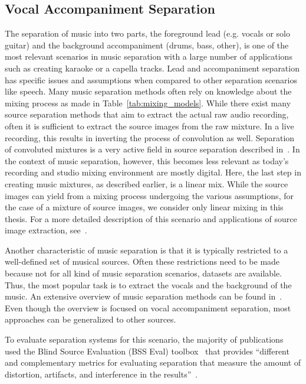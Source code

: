 \subsection{Vocal Accompaniment Separation}
The separation of music into two parts, the foreground lead (e.g. vocals or solo guitar) and the background accompaniment (drums, bass, other), is one of the most relevant scenarios in music separation with a large number of applications such as creating karaoke or a capella tracks.
Lead and accompaniment separation has specific issues and assumptions when compared to other separation scenarios like speech.
Many music separation methods often rely on knowledge about the mixing process as made in Table~\ref{tab:mixing_models}.
While there exist many source separation methods that aim to extract the actual raw audio recording, often it is sufficient to extract the source images from the raw mixture.
In a live recording, this results in inverting the process of convolution as well.
Separation of convoluted mixtures is a very active field in source separation described in~\cite{pedersen07}.
In the context of music separation, however, this becomes less relevant as today's recording and studio mixing environment are mostly digital.
Here, the last step in creating music mixtures, as described earlier, is a linear mix.
While the source images can yield from a mixing process undergoing the various assumptions, for the case of a mixture of source images, we consider only linear mixing in this thesis.
For a more detailed description of this scenario and applications of source image extraction, see~\cite{sturmel12}.
\par
Another characteristic of music separation is that it is typically restricted to a well-defined set of musical sources.
Often these restrictions need to be made because not for all kind of music separation scenarios, datasets are available.
Thus, the most popular task is to extract the vocals and the background of the music.
An extensive overview of music separation methods can be found in~\cite{rafii18}.
Even though the overview is focused on vocal accompaniment separation, most approaches can be generalized to other sources.
\par
To evaluate separation systems for this scenario, the majority of publications used the Blind Source Evaluation (BSS Eval) toolbox~\cite{fevotte05,vincent06} that provides ``different and complementary metrics for evaluating separation that measure the amount of distortion, artifacts, and interference in the results''~\cite{rafii18}.

